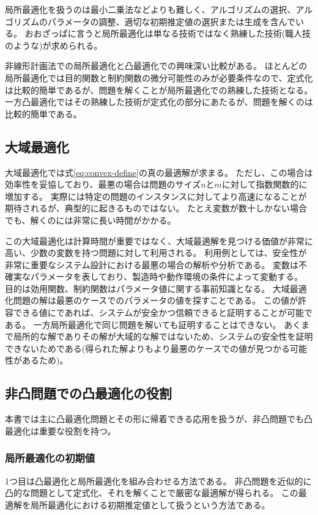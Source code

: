 \documentclass[a4paper, 10pt, uplatex]{jsreport}
\begin{document}
局所最適化を扱うのは最小二乗法などよりも難しく、アルゴリズムの選択、アルゴリズムのパラメータの調整、適切な初期推定値の選択または生成を含んでいる。
おおざっぱに言うと局所最適化は単なる技術ではなく熟練した技術(職人技のような)が求められる。

非線形計画法での局所最適化と凸最適化での興味深い比較がある。
ほとんどの局所最適化では目的関数と制約関数の微分可能性のみが必要条件なので、定式化は比較的簡単であるが、問題を解くことが局所最適化での熟練した技術となる。
一方凸最適化ではその熟練した技術が定式化の部分にあたるが、問題を解くのは比較的簡単である。

\subsection{大域最適化}
大域最適化では式\ref{eq:convex-define}の真の最適解が求まる。
ただし、この場合は効率性を妥協しており、最悪の場合は問題のサイズ$n$と$m$に対して指数関数的に増加する。
実際には特定の問題のインスタンスに対してより高速になることが期待されるが、典型的に起きるものではない。
たとえ変数が数十しかない場合でも、解くのには非常に長い時間がかかる。

この大域最適化は計算時間が重要ではなく、大域最適解を見つける価値が非常に高い、少数の変数を持つ問題に対して利用される。
利用例としては、安全性が非常に重要なシステム設計における最悪の場合の解析や分析である。
変数は不確実なパラメータを表しており、製造時や動作環境の条件によって変動する。
目的は効用関数、制約関数はパラメータ値に関する事前知識となる。
大域最適化問題の解は最悪のケースでのパラメータの値を探すことである。
この値が許容できる値にであれば、システムが安全かつ信頼できると証明することが可能である。
一方局所最適化で同じ問題を解いても証明することはできない。
あくまで局所的な解でありその解が大域的な解ではないため、システムの安全性を証明できないためである(得られた解よりもより最悪のケースでの値が見つかる可能性があるため)。

\subsection{非凸問題での凸最適化の役割}
本書では主に凸最適化問題とその形に帰着できる応用を扱うが、非凸問題でも凸最適化は重要な役割を持つ。

\subsubsection{局所最適化の初期値}
1つ目は凸最適化と局所最適化を組み合わせる方法である。
非凸問題を近似的に凸的な問題として定式化、それを解くことで厳密な最適解が得られる。
この最適解を局所最適化における初期推定値として扱うという方法である。
\end{document}
